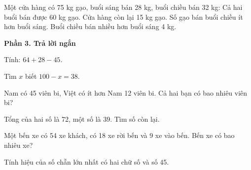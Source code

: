 \begin{ex} %
Một cửa hàng có 75 kg gạo, buổi sáng bán 28 kg, buổi chiều bán 32 kg:
\choiceTF
{\True Cả hai buổi bán được 60 kg gạo.}
{\True Cửa hàng còn lại 15 kg gạo.}
{Số gạo bán buổi chiều ít hơn buổi sáng.}
{\True Buổi chiều bán nhiều hơn buổi sáng 4 kg.}
\end{ex}

\textbf{Phần 3. Trả lời ngắn}

\begin{ex} %
Tính: $64 + 28 - 45$.
\end{ex}

\begin{ex} %
Tìm $x$ biết $100 - x = 38$.
\end{ex}

\begin{ex} %
Nam có 45 viên bi, Việt có ít hơn Nam 12 viên bi. Cả hai bạn có bao nhiêu viên bi?
\end{ex}

\begin{ex} %
Tổng của hai số là 72, một số là 39. Tìm số còn lại.
\end{ex}

\begin{ex} %
Một bến xe có 54 xe khách, có 18 xe rời bến và 9 xe vào bến. Bến xe có bao nhiêu xe?
\end{ex}

\begin{ex} %
Tính hiệu của số chẵn lớn nhất có hai chữ số và số 45.
\end{ex}
